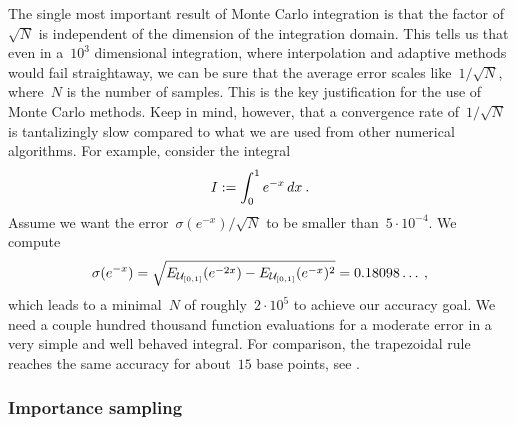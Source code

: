 The single most important result of Monte Carlo integration is that the factor
of~$\sqrt{N}$ is independent of the dimension of the integration domain. This
tells us that even in a~$10^3$ dimensional integration, where interpolation and
adaptive methods would fail straightaway, we can be sure that the average error
scales like~$1/\sqrt{N}$, where~$N$ is the number of samples. This is the key
justification for the use of Monte Carlo methods. Keep in mind, however, that a
convergence rate of~$1/\sqrt{N}$ is tantalizingly slow compared to what we are
used from other numerical algorithms. For example, consider the integral
%
\begin{equation}
  I := \int_0^1 e^{-x} \,dx\:.
\end{equation}
%
Assume we want the error~$\sigma (e^{-x}) / \sqrt{N}$ to be smaller
than~$5 \cdot 10^{-4}$. We compute
%
\begin{equation}\label{sigmaexp}
  \sigma (e^{-x}) =
    \sqrt{E_{\mathcal{U}_{[0,1]}}(e^{-2 x}) - E_{\mathcal{U}_{[0,1]}}(e^{-x})^2} =
    0.18098\ldots \:,
\end{equation}
%
which leads to a minimal~$N$ of roughly~$2\cdot10^5$ to achieve our accuracy
goal. We need a couple hundred thousand function evaluations for a moderate
error in a very simple and well behaved integral. For comparison, the
trapezoidal rule reaches the same accuracy for about~$15$ base points, see
.

\subsubsection{Importance sampling}

